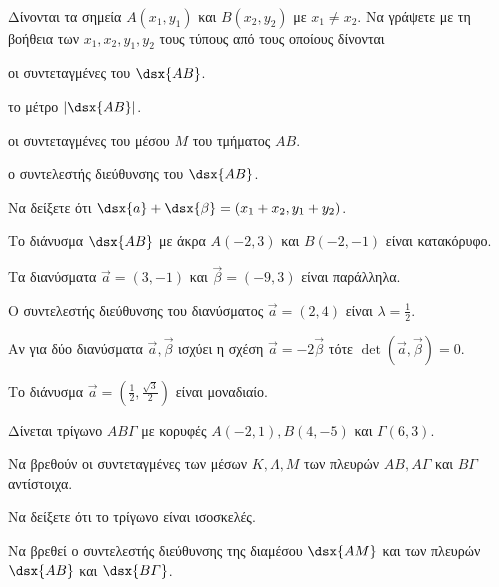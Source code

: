 \documentclass[twoside,nofonts,ektypwsh]{frontisthrio-diag}
\begin{document}
\begin{thema}
\item\mbox{}\\\vspace{-7mm}
\begin{erwthma}
\item Δίνονται τα σημεία $ A(x_1,y_1) $ και $ B(x_2,y_2) $ με $ x_1\neq x_2 $. Να γράψετε με τη βοήθεια των $ x_1,x_2,y_1,y_2 $ τους τύπους από τους οποίους δίνονται
\begin{alist}
\item οι συντεταγμένες του $ \dsx{AB} $.
\item το μέτρο $ |\dsx{AB}| $.
\item οι συντεταγμένες του μέσου $ M $ του τμήματος $ AB $.
\item ο συντελεστής διεύθυνσης του $ \dsx{AB} $.
\end{alist}
\item Να δείξετε ότι $ \dsx{a}+\dsx{\beta}=(x_1+x_2,y_1+y_2) $.
\item \swstolathos
\begin{alist}
\item Το διάνυσμα $ \dsx{AB} $ με άκρα $ A(-2,3) $ και $ B(-2,-1) $ είναι κατακόρυφο.
\item Τα διανύσματα $ \vec{a}=(3,-1) $ και $ \vec{\beta}=(-9,3) $ είναι παράλληλα.
\item Ο συντελεστής διεύθυνσης του διανύσματος $ \vec{a}=(2,4) $ είναι $ \lambda=\frac{1}{2} $.
\item Αν για δύο διανύσματα $ \vec{a},\vec{\beta} $ ισχύει η σχέση $ \vec{a}=-2\vec{\beta} $ τότε $ \det{(\vec{a},\vec{\beta})}=0 $.
\item Το διάνυσμα $ \vec{a}=\left(\frac{1}{2},\frac{\sqrt{3}}{2}\right) $ είναι μοναδιαίο.
\end{alist}
\end{erwthma}
\item Δίνεται τρίγωνο $ AB\varGamma $ με κορυφές $ A(-2,1),B(4,-5) $ και $ \varGamma(6,3) $.
\begin{erwthma}
\item Να βρεθούν οι συντεταγμένες των μέσων $ K,\varLambda,M $ των πλευρών $ AB,A\varGamma $ και $ B\varGamma $ αντίστοιχα.\\
\item Να δείξετε ότι το τρίγωνο είναι ισοσκελές.
\item Να βρεθεί ο συντελεστής διεύθυνσης της διαμέσου $ \dsx{AM} $ και των πλευρών $ \dsx{AB} $ και $ \dsx{B\varGamma} $.

\end{erwthma}
\end{thema}
\end{document}
